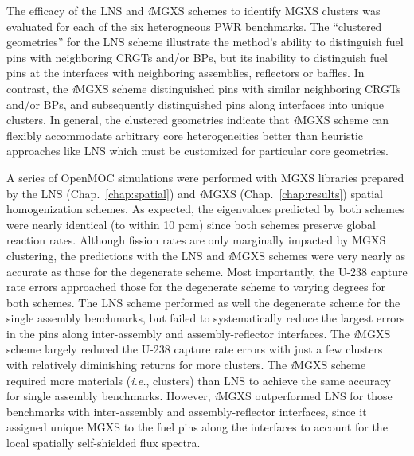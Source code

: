 

The efficacy of the \ac{LNS} and \textit{i}\ac{MGXS} schemes to identify \ac{MGXS} clusters was evaluated for each of the six heterogneous \ac{PWR} benchmarks. The ``clustered geometries'' for the \ac{LNS} scheme illustrate the method's ability to distinguish fuel pins with neighboring \acp{CRGT} and/or \acp{BP}, but its inability to distinguish fuel pins at the interfaces with neighboring assemblies, reflectors or baffles. In contrast, the \textit{i}\ac{MGXS} scheme distinguished pins with similar neighboring \acp{CRGT} and/or \acp{BP}, and subsequently distinguished pins along interfaces into unique clusters. In general, the clustered geometries indicate that \textit{i}\ac{MGXS} scheme can flexibly accommodate arbitrary core heterogeneities better than heuristic approaches like \ac{LNS} which must be customized for particular core geometries.

A series of OpenMOC simulations were performed with \ac{MGXS} libraries prepared by the \ac{LNS} (Chap.~\ref{chap:spatial}) and \textit{i}\ac{MGXS} (Chap.~\ref{chap:results}) spatial homogenization schemes. As expected, the eigenvalues predicted by both schemes were nearly identical (to within 10 \ac{pcm}) since both schemes preserve global reaction rates. Although fission rates are only marginally impacted by \ac{MGXS} clustering, the predictions with the \ac{LNS} and \textit{i}\ac{MGXS} schemes were very nearly as accurate as those for the degenerate scheme. Most importantly, the U-238 capture rate errors approached those for the degenerate scheme to varying degrees for both schemes. The \ac{LNS} scheme performed as well the degenerate scheme for the single assembly benchmarks, but failed to systematically reduce the largest errors in the pins along inter-assembly and assembly-reflector interfaces. The \textit{i}\ac{MGXS} scheme largely reduced the U-238 capture rate errors with just a few clusters with relatively diminishing returns for more clusters. The \textit{i}\ac{MGXS} scheme required more materials (\textit{i.e.}, clusters) than \ac{LNS} to achieve the same accuracy for single assembly benchmarks. However, \textit{i}\ac{MGXS} outperformed \ac{LNS} for those benchmarks with inter-assembly and assembly-reflector interfaces, since it assigned unique \ac{MGXS} to the fuel pins along the interfaces to account for the local spatially self-shielded flux spectra.

